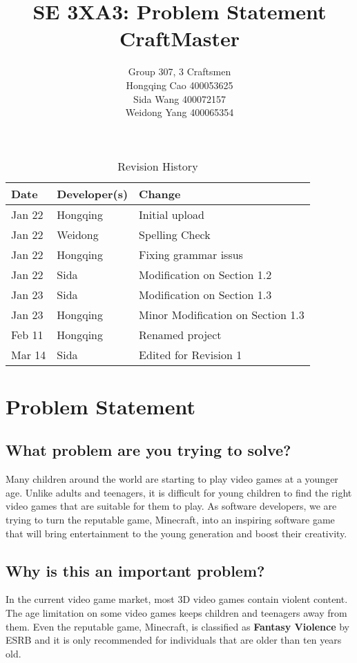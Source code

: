 \documentclass{article} %
\title{SE 3XA3: Problem Statement\\CraftMaster}
\author{Group 307, 3 Craftsmen\\
		Hongqing Cao 400053625\\
		Sida Wang	 400072157\\
		Weidong Yang 400065354}
\date{}
\begin{document}
\maketitle
\newpage
\FloatBarrier
\begin{table}[hp]
\begin{tabularx}{\textwidth}{llX}
\toprule
\textbf{Date} & \textbf{Developer(s)} & \textbf{Change}\\
\midrule
Jan 22 & Hongqing & Initial upload\\
Jan 22 & Weidong & Spelling Check\\
Jan 22 & Hongqing & Fixing grammar issus\\
Jan 22 & Sida & Modification on Section 1.2\\
Jan 23 & Sida & Modification on Section 1.3\\
Jan 23 & Hongqing & Minor Modification on Section 1.3\\
Feb 11 & Hongqing & Renamed project\\
Mar 14 & Sida & Edited for Revision 1\\
\bottomrule
\end{tabularx}
\caption{Revision History} \label{TblRevisionHistory}
\end{table}
\FloatBarrier
\newpage
\section{Problem Statement}

\subsection{What problem are you trying to solve?}

Many children around the world are starting to play video games at a younger age. Unlike adults and teenagers, it is difficult for young children to find the right video games that are suitable for them to play. As software developers, we are trying to turn the reputable game, Minecraft, into an inspiring software game that will bring entertainment to the young generation and boost their creativity.

\subsection{Why is this an important problem?}

In the current video game market, most 3D video games contain violent content. The age limitation on some video games keeps children and teenagers away from them. Even the reputable game, Minecraft, is classified as \textbf{Fantasy Violence}\cite{ESRB} by ESRB and it is only recommended for individuals that are older than ten years old.
\end{document}
